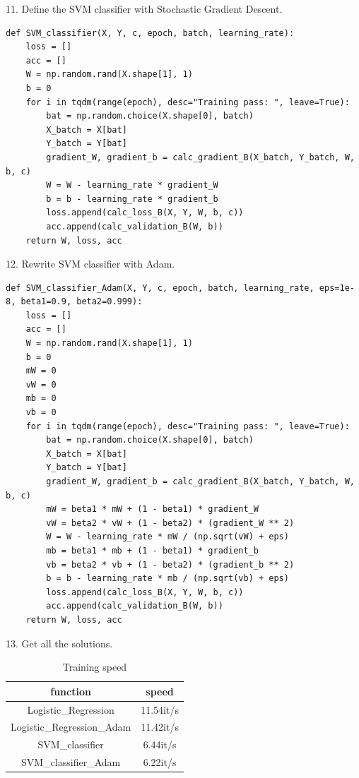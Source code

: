 \documentclass[journal, a4paper]{IEEEtran}
\begin{document}
11. Define the SVM classifier with Stochastic Gradient Descent.
\begin{lstlisting}
def SVM_classifier(X, Y, c, epoch, batch, learning_rate):
    loss = []
    acc = []
    W = np.random.rand(X.shape[1], 1)
    b = 0
    for i in tqdm(range(epoch), desc="Training pass: ", leave=True):
        bat = np.random.choice(X.shape[0], batch)
        X_batch = X[bat]
        Y_batch = Y[bat]
        gradient_W, gradient_b = calc_gradient_B(X_batch, Y_batch, W, b, c)
        W = W - learning_rate * gradient_W
        b = b - learning_rate * gradient_b
        loss.append(calc_loss_B(X, Y, W, b, c))
        acc.append(calc_validation_B(W, b))
    return W, loss, acc
\end{lstlisting}
12. Rewrite SVM classifier with Adam.\par
\begin{lstlisting}
def SVM_classifier_Adam(X, Y, c, epoch, batch, learning_rate, eps=1e-8, beta1=0.9, beta2=0.999):
    loss = []
    acc = []
    W = np.random.rand(X.shape[1], 1)
    b = 0
    mW = 0
    vW = 0
    mb = 0
    vb = 0
    for i in tqdm(range(epoch), desc="Training pass: ", leave=True):
        bat = np.random.choice(X.shape[0], batch)
        X_batch = X[bat]
        Y_batch = Y[bat]
        gradient_W, gradient_b = calc_gradient_B(X_batch, Y_batch, W, b, c)
        mW = beta1 * mW + (1 - beta1) * gradient_W
        vW = beta2 * vW + (1 - beta2) * (gradient_W ** 2)
        W = W - learning_rate * mW / (np.sqrt(vW) + eps)
        mb = beta1 * mb + (1 - beta1) * gradient_b
        vb = beta2 * vb + (1 - beta2) * (gradient_b ** 2)
        b = b - learning_rate * mb / (np.sqrt(vb) + eps)
        loss.append(calc_loss_B(X, Y, W, b, c))
        acc.append(calc_validation_B(W, b))
    return W, loss, acc
\end{lstlisting}
13. Get all the solutions.\par

	\begin{table}[!hbt]
		\begin{center}
		\caption{Training speed}
		\label{tab:simParameters}
		\begin{tabular}{|c|c|}
			\hline
			function & speed \\
			\hline
			Logistic\_Regression & 11.54it/s\\
			\hline
			Logistic\_Regression\_Adam & 11.42it/s\\
			\hline
			SVM\_classifier & 6.44it/s\\
			\hline
			SVM\_classifier\_Adam & 6.22it/s\\
			\hline
		\end{tabular}
		\end{center}
	\end{table}
\end{document}
